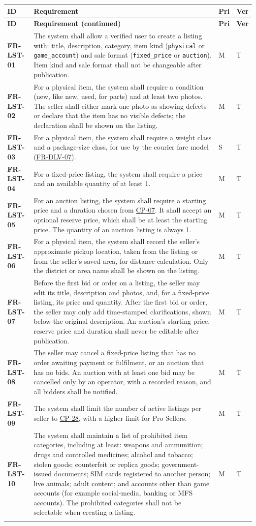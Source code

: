 \documentclass[11pt,a4paper]{report}
\makeatletter
\newenvironment{reqs}{%
  \small
  \begin{longtable}{@{}>{\raggedright\arraybackslash}p{2.35cm}
                       >{\raggedright\arraybackslash}p{10.3cm}
                       >{\centering\arraybackslash}p{0.7cm}
                       >{\centering\arraybackslash}p{0.7cm}@{}}
  \toprule
  \textbf{ID} & \textbf{Requirement} & \textbf{Pri} & \textbf{Ver} \\
  \midrule
  \endfirsthead
  \toprule
  \textbf{ID} & \textbf{Requirement (continued)} & \textbf{Pri} & \textbf{Ver} \\
  \midrule
  \endhead
  \bottomrule
  \endfoot
}{\end{longtable}}
\newcommand{\req}[5]{\leavevmode\textbf{#1}\hypertarget{#1}{} & #5 & #2 & #3 \\ \addlinespace[2pt]}
\newcommand{\rr}[1]{\hyperlink{#1}{#1}}
\newcommand{\cp}[1]{\hyperlink{#1}{#1}}
\makeatother
\begin{document}
\begin{reqs}
\req{FR-LST-01}{M}{T}{FR-10, FR-12}{The system shall allow a verified user to create a listing with: title, description, category, item kind (\texttt{physical} or \texttt{game\_account}) and sale format (\texttt{fixed\_price} or \texttt{auction}). Item kind and sale format shall not be changeable after publication.}
\req{FR-LST-02}{M}{T}{FR-10, FR-11}{For a physical item, the system shall require a condition (new, like new, used, for parts) and at least two photos. The seller shall either mark one photo as showing defects or declare that the item has no visible defects; the declaration shall be shown on the listing.}
\req{FR-LST-03}{S}{T}{new}{For a physical item, the system shall require a weight class and a package-size class, for use by the courier fare model (\rr{FR-DLV-07}).}
\req{FR-LST-04}{M}{T}{FR-13}{For a fixed-price listing, the system shall require a price and an available quantity of at least 1.}
\req{FR-LST-05}{M}{T}{FR-14}{For an auction listing, the system shall require a starting price and a duration chosen from \cp{CP-07}. It shall accept an optional reserve price, which shall be at least the starting price. The quantity of an auction listing is always 1.}
\req{FR-LST-06}{M}{T}{FR-15}{For a physical item, the system shall record the seller's approximate pickup location, taken from the listing or from the seller's saved area, for distance calculation. Only the district or area name shall be shown on the listing.}
\req{FR-LST-07}{M}{T}{FR-16}{Before the first bid or order on a listing, the seller may edit its title, description and photos, and, for a fixed-price listing, its price and quantity. After the first bid or order, the seller may only add time-stamped clarifications, shown below the original description. An auction's starting price, reserve price and duration shall never be editable after publication.}
\req{FR-LST-08}{M}{T}{FR-17}{The seller may cancel a fixed-price listing that has no order awaiting payment or fulfilment, or an auction that has no bids. An auction with at least one bid may be cancelled only by an operator, with a recorded reason, and all bidders shall be notified.}
\req{FR-LST-09}{M}{T}{FR-18}{The system shall limit the number of active listings per seller to \cp{CP-28}, with a higher limit for Pro Sellers.}
\req{FR-LST-10}{M}{T}{new}{The system shall maintain a list of prohibited item categories, including at least: weapons and ammunition; drugs and controlled medicines; alcohol and tobacco; stolen goods; counterfeit or replica goods; government-issued documents; SIM cards registered to another person; live animals; adult content; and accounts other than game accounts (for example social-media, banking or MFS accounts). The prohibited categories shall not be selectable when creating a listing.}

\end{reqs}
\end{document}
